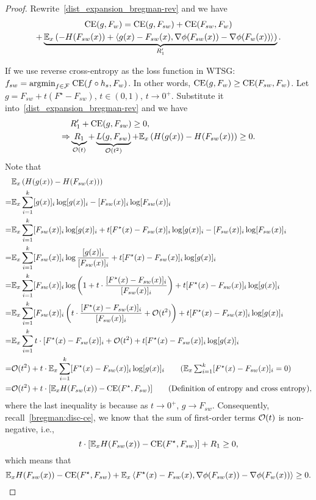\begin{proof}

Rewrite~\cref{dist_expansion_bregman-rev} and we have
\begin{multline} \label{dist_expansion_ce}
    \mathrm{CE}(g, F_w) = \mathrm{CE}(g, F_{sw}) + \mathrm{CE}(F_{sw}, F_w) \\ + \underbrace{\mathbb{E}_x \left( -H(F_{sw}(x)) + \left \langle g(x)-F_{sw}(x), \nabla \phi(F_{sw}(x)) - \nabla \phi(F_w(x)) \right \rangle \right)}_{R'_1}.
\end{multline}

If we use reverse cross-entropy as the loss function in WTSG: $f_{sw} = \text{argmin}_{f \in \mathcal{F}}\; \mathrm{CE}(f \circ h_s, F_w)$.
In other words, $\mathrm{CE}(g, F_w) \ge \mathrm{CE}(F_{sw}, F_w)$.
Let $g=F_{sw} + t(F^\star-F_{sw})$, $t \in (0,1)$, $t \to 0^+$. 
Substitute it into~\cref{dist_expansion_bregman-rev} and we have
\begin{align} \label{bregman:disc-ce}
    & R'_1 + \mathrm{CE}(g, F_{sw}) \ge 0, \nonumber \\ \Rightarrow & \underbrace{R_1}_{\mathcal{O}(t)} + \underbrace{L(g, F_{sw})}_{\mathcal{O}(t^2)} + \mathbb{E}_x \left( H(g(x))-H(F_{sw}(x)) \right) \ge 0.
\end{align}
Note that 
\begin{align*}
    & \expect_x \left( H(g(x))-H(F_{sw}(x)) \right) 
    \\ = & \expect_x \sum_{i=1}^k [g(x)]_i \log [g(x)]_i - [F_{sw}(x)]_i \log [F_{sw}(x)]_i
    \\ = & \expect_x \sum_{i=1}^k [F_{sw}(x)]_i \log [g(x)]_i + t [F^\star(x)-F_{sw}(x)]_i \log [g(x)]_i - [F_{sw}(x)]_i \log [F_{sw}(x)]_i
    \\ = & \expect_x \sum_{i=1}^k [F_{sw}(x)]_i \log \frac{[g(x)]_i}{[F_{sw}(x)]_i}  + t [F^\star(x)-F_{sw}(x)]_i \log [g(x)]_i
    \\ = & \expect_x \sum_{i=1}^k [F_{sw}(x)]_i \log \left( 1+ t \cdot \frac{[F^\star(x)-F_{sw}(x)]_i}{[F_{sw}(x)]_i} \right)  + t [F^\star(x)-F_{sw}(x)]_i \log [g(x)]_i
    \\ = & \expect_x \sum_{i=1}^k [F_{sw}(x)]_i \left( t \cdot \frac{[F^\star(x)-F_{sw}(x)]_i}{[F_{sw}(x)]_i} + \cO(t^2) \right)  + t [F^\star(x)-F_{sw}(x)]_i \log [g(x)]_i
    \\ = & \expect_x \sum_{i=1}^k t \cdot [F^\star(x)-F_{sw}(x)]_i + \cO(t^2) + t [F^\star(x)-F_{sw}(x)]_i \log [g(x)]_i
    \\ = & \cO(t^2) + t \cdot \expect_x \sum_{i=1}^k [F^\star(x)-F_{sw}(x)]_i \log [g(x)]_i \tag{$\expect_x \sum_{i=1}^k [F^\star(x)-F_{sw}(x)]_i =0$}
    \\ = & \cO(t^2) + t \cdot  [\expect_x H(F_{sw}(x))-\cross(F^\star,F_{sw})] \tag{Definition of entropy and cross entropy},
\end{align*}
where the last inequality is because as $t \to 0^+$, $g \to F_{sw}$.
Consequently, recall~\cref{bregman:disc-ce}, we know that the sum of first-order terms $\mathcal{O}(t)$ is non-negative, i.e.,
$$t \cdot  [\mathbb{E}_x H(F_{sw}(x))-\mathrm{CE}(F^\star,F_{sw})] + R_1 \ge 0,$$
which means that
$$\mathbb{E}_x H(F_{sw}(x)) - \mathrm{CE}(F^\star,F_{sw}) +  \mathbb{E}_x\left \langle F^\star(x)-F_{sw}(x), \nabla \phi(F_{sw}(x)) - \nabla \phi(F_w(x)) \right \rangle \ge 0.$$


\end{proof}
